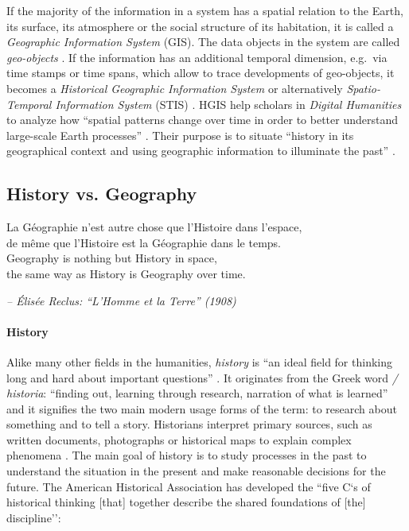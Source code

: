 If the majority of the information in a system has a spatial relation to the Earth, its surface, its atmosphere or the social structure of its habitation, it is called a \emph{Geographic Information System} (GIS). The data objects in the system are called \emph{geo-objects}
\cite{bolstad2008gis}.
If the information has an additional temporal dimension, e.g.\ via time stamps or time spans, which allow to trace developments of geo-objects, it becomes a \emph{Historical Geographic Information System}
\cite{gregory2014toward}
or alternatively \emph{Spatio-Temporal Information System} (STIS)
\cite{pelekis04stdms}.
HGIS help scholars in \emph{Digital Humanities} to analyze how ``spatial patterns change over time in order to better understand large-scale Earth processes''
\cite{peuquet99}.
Their purpose is to situate ``history in its geographical context and using geographic information to illuminate the past''
\cite{knowles2008placing}.

\subsection{History vs. Geography} %
\label{sub:history_vs_geography}

\begin{quoteit}
La Géographie n’est autre chose que l’Histoire dans l’espace, \\
de même que l’Histoire est la Géographie dans le temps. \\[1.0em]
Geography is nothing but History in space, \\
the same way as History is Geography over time.
\end{quoteit}
\hfill \textit{-- Élisée Reclus: ``L'Homme et la Terre'' (1908)}

\paragraph{History} %
\label{par:history}


Alike many other fields in the humanities, \emph{history} is ``an ideal field for thinking long and hard about important questions''
\cite{ahaFiveCs}.
It originates from the Greek word \emph{\textIota\textsigma\texttau\textomikron\textrho\textiota\textalpha / historia}: ``finding out, learning through research, narration of what is learned'' \cite{dict}
and it signifies the two main modern usage forms of the term: to research about something and to tell a story. Historians interpret primary sources, such as written documents, photographs or historical maps to explain complex phenomena \cite[pp.4-7]{knowles2008placing}. The main goal of history is to study processes in the past to understand the situation in the present and make reasonable decisions for the future. The American Historical Association has developed the ``five C`s of historical thinking [that] together describe the shared foundations of [the] discipline''\cite{ahaFiveCs}:

